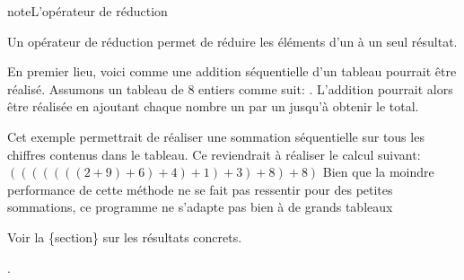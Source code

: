 \documentclass[letterpaper,10pt,french]{sphinxmanual}
\begin{document}
\begin{sphinxadmonition}{note}{L’opérateur de réduction}

Un opérateur de réduction permet de réduire les éléments d’un  à un seul résultat. 
\end{sphinxadmonition}

En premier lieu, voici comme une addition séquentielle d’un tableau pourrait être réalisé. Assumons un tableau de 8 entiers comme suit: . L’addition pourrait alors être réalisée en ajoutant chaque nombre un par un jusqu’à obtenir le total.

\begin{sphinxVerbatim}[commandchars=\\\{\}]
  \PYG{p}{[}\PYG{p}{]}
  
   
      
\end{sphinxVerbatim}

Cet exemple permettrait de réaliser une sommation séquentielle sur tous les chiffres contenus dans le tableau. Ce reviendrait à réaliser le calcul suivant:
\((((((((2+9)+6)+4)+1)+3)+8)+8)\)
Bien que la moindre performance de cette méthode ne se fait pas ressentir pour des petites sommations, ce programme ne s’adapte pas bien à de grands tableaux%
\begin{footnote}[29]\sphinxAtStartFootnote
Voir la \{section\} sur les résultats concrets.
%
\end{footnote}.
\end{document}
